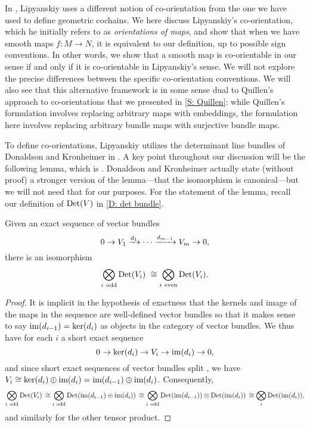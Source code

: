 In \cite{Lipy14}, Lipyanskiy uses a different notion of co-orientation from the one we have used to define geometric cochains.
We here discuss Lipyanskiy's co-orientation, which he initially refers to as \textit{orientations of maps}, and show that when we have smooth maps $f \colon M \to N$, it is equivalent to our definition, up to possible sign conventions.
In other words, we show that a smooth map is co-orientable in our sense if and only if it is co-orientable in Lipyanskiy's sense.
We will not explore the precise differences between the specific co-orientation conventions.
We will also see that this alternative framework is in some sense dual to Quillen's approach to co-orientations that we presented in \cref{S: Quillen}: while Quillen's formulation involves replacing arbitrary maps with embeddings, the formulation here involves replacing arbitrary bundle maps with surjective bundle maps.

To define co-orientations, Lipyanskiy utilizes the determinant line bundles of Donaldson and Kronheimer in \cite[Section 5.2.1]{DoKr90}.
A key point throughout our discussion will be the following lemma, which is \cite[Lemma 5.2.2]{DoKr90}.
Donaldson and Kronheimer actually state (without proof) a stronger version of the lemma---that the isomorphism is canonical---but we will not need that for our purposes.
For the statement of the lemma, recall our definition of ${\rm Det}(V)$ in \cref{D: det bundle}.

\begin{lemma}\label{L: det sequence}
	Given an exact sequence of vector bundles
	\[
	0 \to V_1 \xrightarrow{d_1} \cdots \xrightarrow{d_{m-1}} V_m \to 0,
	\]
	there is an isomorphism
	\[
	\bigotimes_{i\ \text{odd}} {\rm Det}(V_i) \ \cong
	\bigotimes_{i\ \text{even}} {\rm Det}(V_i).
	\]
\end{lemma}

\begin{proof}
	It is implicit in the hypothesis of exactness that the kernels and image of the maps in the sequence are well-defined vector bundles so that it makes sense to say $\text{im}(d_{i-1}) = \ker(d_{i})$ as objects in the category of vector bundles.
	We thus have for each $i$ a short exact sequence
	\[
	0 \to \ker(d_i) \to V_i \to \text{im}(d_i) \to 0,
	\]
	and since short exact sequences of vector bundles split \cite[Theorem 3.9.6]{Hus75}, we have $V_i \cong \ker(d_i) \oplus \text{im}(d_i) = \text{im}(d_{i-1}) \oplus \text{im}(d_i)$.
	Consequently,
	\[
	\bigotimes_{i\ \text{odd}} {\rm Det}(V_i)\, \cong
	\bigotimes_{i\ \text{odd}} {\rm Det}(\text{im}(d_{i-1}) \oplus \text{im}(d_i))\, \cong
	\bigotimes_{i\ \text{odd}} {\rm Det}(\text{im}(d_{i-1})) \otimes {\rm Det}(\text{im}(d_i))\, \cong
	\bigotimes_i {\rm Det}(\text{im}(d_{i})),
	\]
	and similarly for the other tensor product.
\end{proof}

